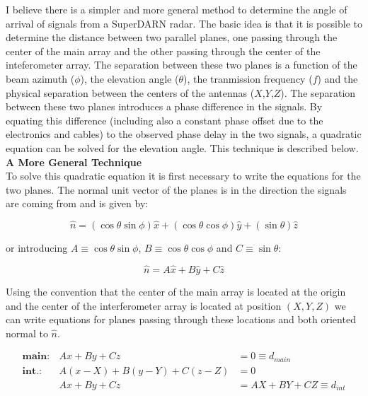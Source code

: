 \documentclass{article}
\begin{document}
\noindent
I believe there is a simpler and more general method to determine the angle
of arrival of signals from a SuperDARN radar. The basic idea is that it is
possible to determine the distance between two parallel planes, one passing
through the center of the main array and the other passing through the center
of the inteferometer array. The separation between these two planes
is a function of the beam azimuth ($\phi$), the elevation angle ($\theta$),
the tranmission frequency ($f$) and the physical separation between the
centers of the antennas ($X$,$Y$,$Z$). The separation between these two planes
introduces a phase difference in the signals. By equating this difference
(including also a constant phase offset due to the electronics and cables)
to the observed phase delay in the two signals, a quadratic equation can be
solved for the elevation angle. This technique is described below. \\

\noindent
{\large \bf A More General Technique} \\

\noindent
To solve this quadratic equation it is first necessary to write the equations
for the two planes. The normal unit vector of the planes is in the direction
the signals are coming from and is given by:

\begin{equation}
\hat{n} = \left( \cos \theta \sin \phi \right) \hat{x} +
					\left( \cos \theta \cos \phi \right) \hat{y} +
					\left( \sin \theta \right) \hat{z} \label{eq:norm}
\end{equation}

\noindent
or introducing $A \equiv \cos \theta \sin \phi$,
$B \equiv \cos \theta \cos \phi$ and $C \equiv \sin \theta$:

\begin{equation}
\hat{n} = A \hat{x} + B \hat{y} + C \hat{z}
\end{equation}

\noindent
Using the convention that the center of the main array is located at the
origin and the center of the interferometer array is located at position
$(X,Y,Z)$ we can write equations for planes passing through these locations
and both oriented normal to $\hat{n}$.

\begin{eqnarray}
\mathbf{main:} & Ax + By + Cz & = 0 \equiv d_{main} \\
\mathbf{int.:} & A(x-X) + B(y-Y) + C(z-Z) & = 0 \\
& Ax + By + Cz & = AX + BY + CZ \equiv d_{int}
\end{eqnarray}
\end{document}
